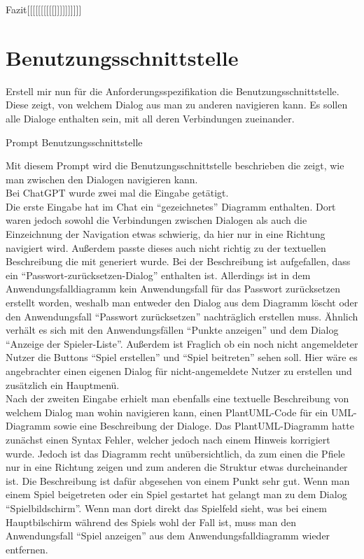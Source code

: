 Fazit[[[[[[[[[[]]]]]]]]]]

\section*{Benutzungsschnittstelle}

\begin{prompt}[H]
    \begin{tcolorbox}[colback=gray!20, colframe=gray!20, boxrule=0pt, sharp corners] 
        Erstell mir nun für die Anforderungsspezifikation die Benutzungsschnittstelle. Diese zeigt, von welchem Dialog aus man zu anderen 
        navigieren kann. Es sollen alle Dialoge enthalten sein, mit all deren Verbindungen zueinander.
        \vfill
    \end{tcolorbox}
    \caption{Prompt Benutzungsschnittstelle}
    \label{Prompt Benutzungsschnittstelle}
\end{prompt}

Mit diesem Prompt wird die Benutzungsschnittstelle beschrieben die zeigt, wie man zwischen den Dialogen navigieren kann.\\

Bei ChatGPT wurde zwei mal die Eingabe getätigt.\\
Die erste Eingabe hat im Chat ein ``gezeichnetes'' Diagramm enthalten. Dort waren jedoch sowohl die Verbindungen zwischen Dialogen als auch 
die Einzeichnung der Navigation etwas schwierig, da hier nur in eine Richtung navigiert wird. Außerdem passte dieses auch nicht richtig zu 
der textuellen Beschreibung die mit generiert wurde. Bei der Beschreibung ist aufgefallen, dass ein ``Passwort-zurücksetzen-Dialog'' enthalten 
ist. Allerdings ist in dem Anwendungsfalldiagramm kein Anwendungsfall für das Passwort zurücksetzen erstellt worden, weshalb man entweder 
den Dialog aus dem Diagramm löscht oder den Anwendungsfall ``Passwort zurücksetzen'' nachträglich erstellen muss. Ähnlich verhält es sich mit 
den Anwendungsfällen ``Punkte anzeigen'' und dem Dialog ``Anzeige der Spieler-Liste''. Außerdem ist Fraglich 
ob ein noch nicht angemeldeter Nutzer die Buttons ``Spiel erstellen'' und ``Spiel beitreten'' sehen soll. Hier wäre es angebrachter einen 
eigenen Dialog für nicht-angemeldete Nutzer zu erstellen und zusätzlich ein Hauptmenü.\\
Nach der zweiten Eingabe erhielt man ebenfalls eine textuelle Beschreibung von welchem Dialog man wohin navigieren kann, einen PlantUML-Code
für ein UML-Diagramm sowie eine Beschreibung der Dialoge. Das PlantUML-Diagramm hatte zunächst einen Syntax Fehler, welcher jedoch nach einem 
Hinweis korrigiert wurde. Jedoch ist das Diagramm recht unübersichtlich, da zum einen die Pfiele nur in eine Richtung zeigen und zum anderen
die Struktur etwas durcheinander ist. Die Beschreibung ist dafür abgesehen von einem Punkt sehr gut. Wenn man einem Spiel beigetreten oder 
ein Spiel gestartet hat gelangt man zu dem Dialog ``Spielbildschirm''. Wenn man dort direkt das Spielfeld sieht, was bei einem Hauptbilschirm
während des Spiels wohl der Fall ist, muss man den Anwendungsfall ``Spiel anzeigen'' aus dem Anwendungsfalldiagramm wieder entfernen.\\

